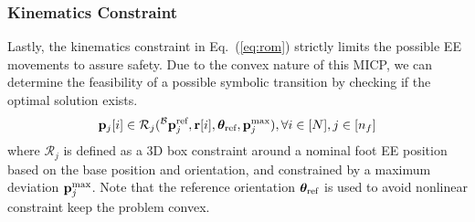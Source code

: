 \subsubsection{Kinematics Constraint}
Lastly, the kinematics constraint in Eq.~(\ref{eq:rom}) strictly limits the possible EE movements to assure safety.
Due to the convex nature of this MICP, we can determine the feasibility of a possible symbolic transition by checking if the optimal solution exists.
\begin{equation}
    \label{eq:rom}
    \mathbf{p}_j[i] \in \mathcal{R}_j(^\mathcal{B} \mathbf{p}_j^{\text{ref}}, \mathbf{r}[i],\bm{\theta}_{\text{ref}}, \mathbf{p}_j^{\text{max}}), \forall i \in [N], j \in [n_f]
\end{equation}
where $\mathcal{R}_j$ is defined as a 3D box constraint around a nominal foot EE position based on the base position and orientation, and constrained by a maximum deviation $\mathbf{p}_j^{\text{max}}$. Note that the reference orientation $\bm{\theta}_{\text{ref}}$ is used to avoid nonlinear constraint keep the problem convex.



